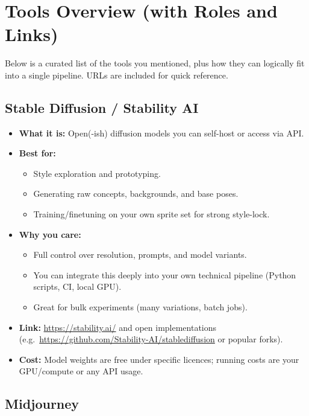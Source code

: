 \documentclass[11pt]{article}
\begin{document}
\section{Tools Overview (with Roles and Links)}

Below is a curated list of the tools you mentioned, plus how they can logically fit into a single pipeline. URLs are included for quick reference.

\subsection{Stable Diffusion / Stability AI}

\begin{itemize}
    \item \textbf{What it is:} Open(-ish) diffusion models you can self-host or access via API.
    \item \textbf{Best for:}
    \begin{itemize}
        \item Style exploration and prototyping.
        \item Generating raw concepts, backgrounds, and base poses.
        \item Training/finetuning on your own sprite set for strong style-lock.
    \end{itemize}
    \item \textbf{Why you care:}
    \begin{itemize}
        \item Full control over resolution, prompts, and model variants.
        \item You can integrate this deeply into your own technical pipeline (Python scripts, CI, local GPU).
        \item Great for bulk experiments (many variations, batch jobs).
    \end{itemize}
    \item \textbf{Link:} \url{https://stability.ai/} and open implementations (e.g.\ \url{https://github.com/Stability-AI/stablediffusion} or popular forks).
    \item \textbf{Cost:} Model weights are free under specific licences; running costs are your GPU/compute or any API usage.
\end{itemize}

\subsection{Midjourney}
\end{document}
